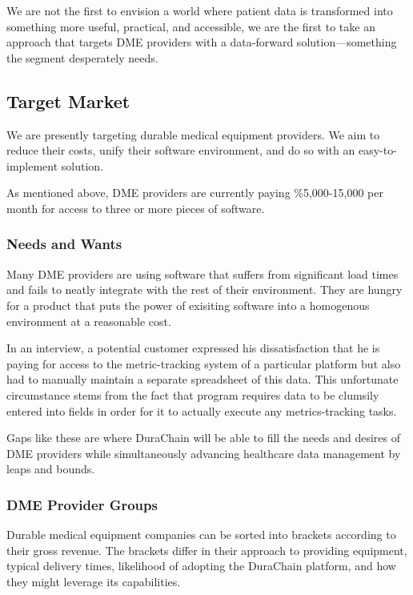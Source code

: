 \documentclass[letterpaper]{article}
\begin{document}
We are not the first to envision a world where patient data is transformed into something more useful, practical, and accessible, we are the first to take an approach that targets DME providers with a data-forward solution---something the segment desperately needs.%

\subsection{Target Market}
We are presently targeting durable medical equipment providers. We aim to reduce their costs, unify their software environment, and do so with an easy-to-implement solution.%

As mentioned above, DME providers are currently paying \%5,000-15,000 per month for access to three or more pieces of software.%

  \subsubsection{Needs and Wants}
  Many DME providers are using software that suffers from significant load times and fails to neatly integrate with the rest of their environment. They are hungry for a product that puts the power of exisiting software into a homogenous environment at a reasonable cost.%

  In an interview, a potential customer expressed his dissatisfaction that he is paying for access to the metric-tracking system of a particular platform but also had to manually maintain a separate spreadsheet of this data. This unfortunate circumstance stems from the fact that program requires data to be clumsily entered into fields in order for it to actually execute any metrics-tracking tasks.%

  Gaps like these are where DuraChain will be able to fill the needs and desires of DME providers while simultaneously advancing healthcare data management by leaps and bounds.%

  \subsubsection{DME Provider Groups}
  Durable medical equipment companies can be sorted into brackets according to their gross revenue. The brackets differ in their approach to providing equipment, typical delivery times, likelihood of adopting the DuraChain platform, and how they might leverage its capabilities.%
\end{document}

